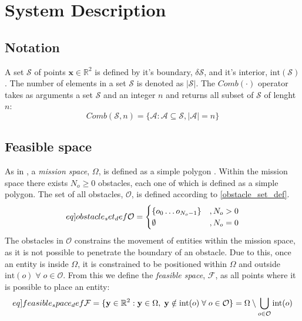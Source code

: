 \section{System Description}

\subsection{Notation}
A set $\mathcal{S}$ of points $\mathbf{x}\in\mathbb{R}^{2}$ is defined by it's boundary, $\delta\mathcal{S}$, 
and it's interior, $\mathrm{int}(\mathcal{S})$. The number of elements in a set $\mathcal{S}$ is denoted as $|\mathcal{S}|$.\newline
The $Comb(\cdot)$ operator takes as arguments a set $\mathcal{S}$ and an integer $n$ and returns all subset of $\mathcal{S}$ of lenght $n$:
\begin{equation}
  Comb(\mathcal{S}, n) = \{\mathcal{A}: \mathcal{A}\subseteq\mathcal{S}, |\mathcal{A}|=n\}
\end{equation}

\subsection{Feasible space}
As in \cite{sun2014escaping}, a \textit{mission space}, $\Omega$, is defined as a simple polygon 
\cite{weissteinsimplepolygon}.
Within the mission space there exists $N_{o}\geq 0$ obstacles, each one of which is defined as a simple polygon.
The set of all obstacles, $\mathcal{O}$, is defined according to \eqref{obstacle_set_def}.
\begin{equation}\label[eq]{obstacle_set_def}
  \mathcal{O} = \begin{cases}
    \{o_{0}\hdots o_{N_{o}-1}\} &, N_{o} > 0\\
    \emptyset &, N_{o} = 0\\
  \end{cases}
\end{equation}
The obstacles in $\mathcal{O}$ constrains the movement of entities within the mission space, as it is not possible to
penetrate the boundary of an obstacle. Due to this, once an entity is inside $\Omega$, it is constrained to be positioned within
$\Omega$ and outside $\mathrm{int}(o)\;\forall\;o\in\mathcal{O}$. From this we define the \textit{feasible space}, $\mathcal{F}$, as
all points where it is possible to place an entity:
\begin{equation}\label[eq]{feasible_space_def}
  \mathcal{F} = \{\mathbf{y}\in\mathbb{R}^{2}: \mathbf{y}\in\Omega,\;\mathbf{y}\notin\mathrm{int}(o)\;\forall\;o\in\mathcal{O}\} = \Omega\setminus\bigcup_{o\in\mathcal{O}}\mathrm{int}(o)
\end{equation}

